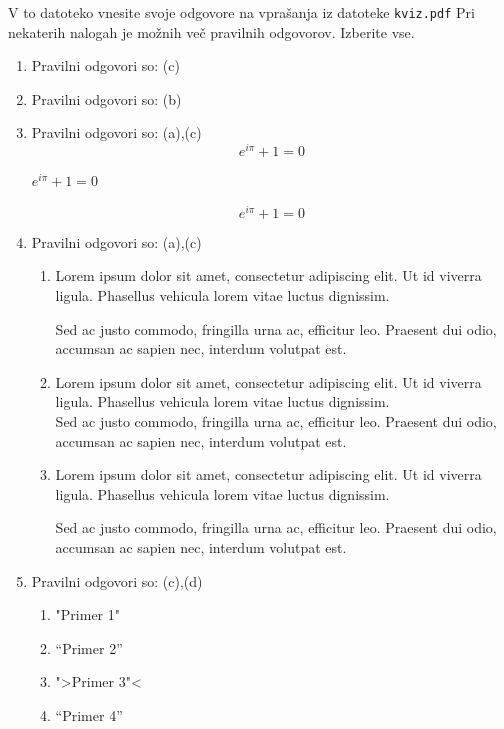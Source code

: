 \documentclass[11pt]{article}
\begin{document}
V to datoteko vnesite svoje odgovore na vprašanja iz datoteke \texttt{kviz.pdf}
Pri nekaterih nalogah je možnih več pravilnih odgovorov. Izberite vse.

\begin{enumerate}
    \item Pravilni odgovori so: (c)
    
    \item Pravilni odgovori so: (b)
    
    \item Pravilni odgovori so:  (a),(c)
      \[ e^{i \pi} + 1 = 0 \]
      \begin{center}
          \( e^{i \pi} + 1 = 0 \)
      \end{center}
      \begin{equation*}
          e^{i \pi} + 1 = 0
      \end{equation*}

    \item Pravilni odgovori so: (a),(c)
        \begin{enumerate}
            \item {
Lorem ipsum dolor sit amet, consectetur adipiscing 
elit. Ut id viverra ligula. Phasellus vehicula lorem 
vitae luctus dignissim. 
                
Sed ac justo commodo, fringilla urna ac, efficitur 
leo. Praesent dui odio, accumsan ac sapien nec, 
interdum volutpat est. 
            }
            \item {
Lorem ipsum dolor sit amet, consectetur adipiscing 
elit. Ut id viverra ligula. Phasellus vehicula lorem 
vitae luctus dignissim. \\
Sed ac justo commodo, fringilla urna ac, efficitur 
leo. Praesent dui odio, accumsan ac sapien nec, 
interdum volutpat est.             }
            \item {
Lorem ipsum dolor sit amet, consectetur adipiscing 
elit. Ut id viverra ligula. Phasellus vehicula lorem 
vitae luctus dignissim. \par
Sed ac justo commodo, fringilla urna ac, efficitur 
leo. Praesent dui odio, accumsan ac sapien nec, 
interdum volutpat est.             }
        \end{enumerate}
    
      \item Pravilni odgovori so: (c),(d)
        \begin{enumerate}
          \item "Primer 1"
          \item ``Primer 2''
          \item ">Primer 3"<
          \item "`Primer 4"'
        \end{enumerate}


\end{enumerate}
\end{document}
